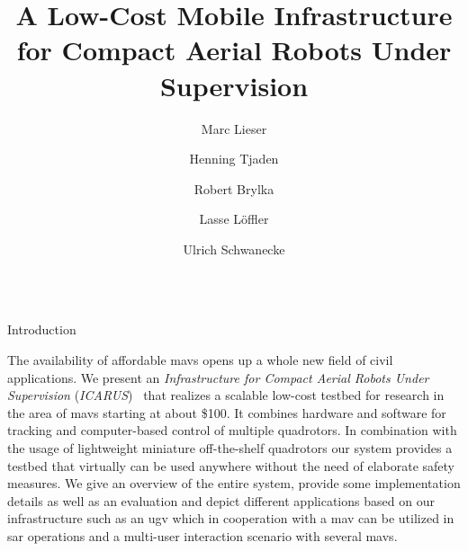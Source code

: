 \documentclass[final,hyperref={pdfpagelabels=false}]{beamer}
\title{
A Low-Cost Mobile Infrastructure\\[0.5ex] for Compact Aerial Robots Under Supervision
} %
\author{%
Marc Lieser \and Henning Tjaden \and Robert Brylka \and Lasse L{\"o}ffler \and Ulrich Schwanecke
} %
\institute{%
Computer Vision \& Mixed Reality Group, Hochschule RheinMain University of Applied Sciences, Wiesbaden
} %
\newcommand{\blocktextwidth}{0.93\textwidth}
\newcommand{\icarus}{\textit{ICARUS}}
\begin{document}
\begin{frame}[t] %

\begin{columns}[t] %


\begin{column}{.31\textwidth} %


{


\vspace{1.11em}

\begin{block}{Introduction}
\begin{minipage}[]{\blocktextwidth}
The availability of affordable \glspl{mav} opens up a whole new field of civil applications.
We present an \emph{Infrastructure for Compact Aerial Robots Under Supervision} (\icarus{})~\cite{lieser2017} that realizes a scalable low-cost testbed for research in the area of \glspl{mav} starting at about \$100.
It combines hardware and software for tracking and computer-based control of multiple quadrotors.
In combination with the usage of lightweight miniature off-the-shelf quadrotors our system provides a testbed that virtually can be used anywhere without the need of elaborate safety measures.
We give an overview of the entire system, provide some implementation details as well as an evaluation and depict different applications based on our infrastructure such as an \gls{ugv} which in cooperation with a \gls{mav} can be utilized in \gls{sar} operations
and a multi-user interaction scenario with several \glspl{mav}.
\end{minipage}
\end{block}
}


\end{column}
\end{columns}
\end{frame}
\end{document}
